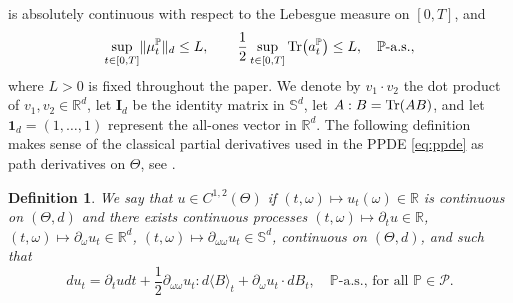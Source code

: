 \documentclass[12pt]{article}
\newtheorem{definition}[prop]{Definition}
\numberwithin{equation}{section}
\newcommand{\norm}[1]{\lVert#1\rVert}
\def\P{{\mathord{\mathbb P}}}
\newcommand{\real}{\mathbb{R}}
\let\oldcitet=\citet
\renewcommand{\cite}[1]{\textcolor[rgb]{0,0,1}{\oldcitet{#1}}}
\renewcommand{\citet}[1]{\textcolor[rgb]{0,0,1}{\oldcitet{#1}}}
\begin{document}
is absolutely continuous with respect to
the Lebesgue measure on $[0,T]$, and
\begin{equation*}
  \sup\limits_{t \in[0,T]} \norm{\mu^\mathbb{P}_t}_d\leq L,
  \qquad
	\frac{1}{2}\sup\limits_{t \in[0,T]} {\rm Tr} \big(a^\mathbb{P}_t\big) \leq L,
	\quad \mathbb{P}\text{-a.s.},
\end{equation*}
 where $L > 0$ is fixed throughout the paper.
 We denote by $v_1 \cdot v_2$ the dot product of
$v_1, v_2 \in \real^d$, let $\bm{I}_d$
be the identity matrix in $\mathbb{S}^d$,
 let $A:B = {\rm Tr} (AB)$,
 and let $\bm{1}_d=(1,\ldots , 1)$ represent the all-ones vector in $\real^d$.
The following definition makes sense of
the classical partial derivatives used in the PPDE \eqref{eq:ppde}
 as path derivatives on $\Theta$,
see \cite{ekren2016viscosity1}.
\begin{definition}
\nonumber %
	We say that
    $u \in C^{1,2}(\Theta)$
	if $(t, \omega ) \mapsto u_t(\omega ) \in \real$ is continuous
        on $(\Theta , d)$
	and there exists continuous processes
        $(t, \omega ) \mapsto \partial_t u \in \real$,
	$(t, \omega ) \mapsto \partial_\omega u_t \in \real^d$,
        $(t, \omega ) \mapsto \partial_{\omega\omega} u_t \in \mathbb{S}^d$,
        continuous         on $(\Theta , d)$, and such that
	\begin{equation}
		du_t = \partial_t u dt + \frac{1}{2} \partial_{\omega\omega} u_t:d\langle B \rangle_t
		+ \partial_\omega u_t \cdot dB_t, \quad \P\text{-a.s., for all } \P \in \mathcal{P}.
	\end{equation}
\end{definition}
\end{document}
